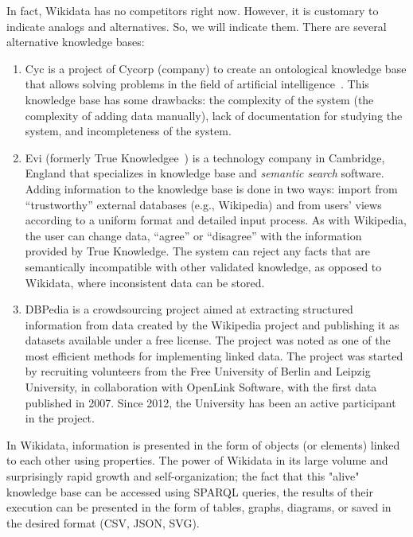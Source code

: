 In fact, Wikidata has no competitors right now. However, it is customary to indicate analogs and alternatives. So, we will indicate them. There are several alternative knowledge bases:
\begin{enumerate}
\item Cyc is a project of Cycorp (company) to create an ontological knowledge base that allows solving problems in the field of artificial intelligence~. This knowledge base has some drawbacks: the complexity of the system (the complexity of adding data manually), lack of documentation for studying the system, and incompleteness of the system. 
\item Evi (formerly True Knowledgee~) is a technology company in Cambridge, England that specializes in knowledge base and \textit{semantic search} 
 software. Adding information to the knowledge base is done in two ways: import from ``trustworthy'' external databases (e.g., Wikipedia) and from users' views according to a uniform format and detailed input process. As with Wikipedia, the user can change
data, ``agree'' or ``disagree'' with the information provided by True Knowledge. The system can reject any facts that are semantically incompatible with other validated knowledge, as opposed to Wikidata, where inconsistent data can be stored.
\item DBPedia is a crowdsourcing project aimed at extracting structured information from data created by the Wikipedia project and publishing it as datasets available under a free license. The project was noted as one of the most efficient methods for implementing linked data.
The project was started by recruiting volunteers from the Free University of Berlin and Leipzig University, in collaboration with OpenLink Software, with the first data published in 2007. Since 2012, the University has been an active participant in the project.
\end{enumerate}
In Wikidata, information is presented in the form of objects (or elements) linked to each other using properties. The power of Wikidata in its large volume and surprisingly rapid growth and self-organization; the fact that this "alive" knowledge base can be accessed using SPARQL queries, the results of their execution can be presented in the form of tables, graphs, diagrams, or saved in the desired format (CSV, JSON, SVG).

